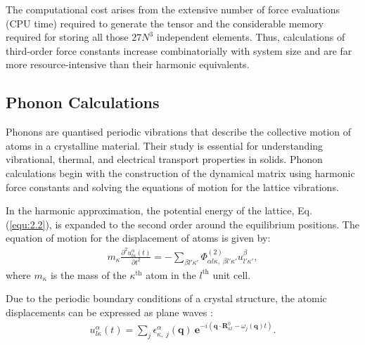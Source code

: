 The computational cost arises from the extensive number of force evaluations (CPU time) required to generate the tensor and the considerable memory required for storing all those \(27N^3\) independent elements. 
Thus, calculations of third-order force constants increase combinatorially with system size and are far more resource-intensive than their harmonic equivalents.

\subsection{Phonon Calculations} \label{subsec:2.1.2}

Phonons are quantised periodic vibrations that describe the collective motion of atoms in a crystalline material. Their study is essential for understanding vibrational, thermal, and electrical transport properties in solids.
Phonon calculations begin with the construction of the dynamical matrix using harmonic force constants and solving the equations of motion for the lattice vibrations.


In the harmonic approximation, the potential energy of the lattice, Eq. (\ref{equ:2.2}), is expanded to the second order around the equilibrium positions. 
The equation of motion for the displacement of atoms is given by:
\begin{equation}
\label{equ:2.7}
    \begin{split}
        m_{\kappa}\frac{\partial^{2} u^{\alpha}_{l\kappa}(t)}{\partial t^{2}}=-\sum_{\beta l' \kappa'} \Phi^{(2)}_{\alpha l\kappa,\;\beta l'\kappa'}u^{\beta}_{l'\kappa'},
    \end{split}
\end{equation}
where $m_{\kappa}$ is the mass of the $\kappa^{\text{th}}$ atom in the $l^{\text{th}}$ unit cell.

Due to the periodic boundary conditions of a crystal structure, the atomic displacements can be expressed as plane waves \cite{ziman_2007,kantorovich_2004}:
\begin{equation}
\label{equ:2.8}
    \begin{split}
        u^{\alpha}_{l\kappa}(t)= \sum_{j}\epsilon^{\alpha}_{\kappa,\;j}(\mathbf{q})\:\textbf{e}^{-i\left(\mathbf{q}\cdot\mathbf{R}^{0}_{\kappa l}-\omega_{j}(\mathbf{q})t\right)}.
    \end{split}
\end{equation}

